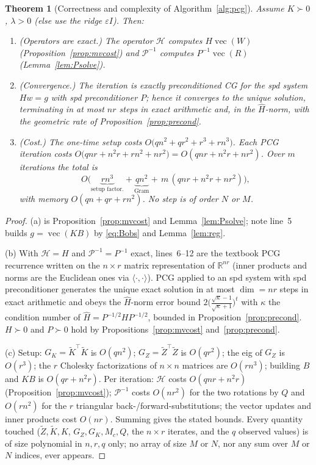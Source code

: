 \documentclass[12pt]{article}
\DeclareMathOperator{\vecop}{vec}
\newcommand{\bR}{\mathbb{R}}
\newcommand{\tZ}{\tilde Z}
\newcommand{\tK}{\tilde K}
\newtheorem{theorem}{Theorem}
\theoremstyle{definition}
\begin{document}
\begin{theorem}[Correctness and complexity of Algorithm~\ref{alg:pcg}]\label{thm:pcg}
Assume $K\succ0$, $\lambda>0$ (else use the ridge $\varepsilon I$). Then:
\begin{enumerate}[label=(\alph*)]
\item \emph{(Operators are exact.)} The operator $\mathcal H$ computes $H\vecop(W)$
(Proposition~\ref{prop:mvcost}) and $\mathcal P^{-1}$ computes $P^{-1}\vecop(R)$
(Lemma~\ref{lem:Psolve}).
\item \emph{(Convergence.)} The iteration is exactly preconditioned CG for the spd
system $Hw=g$ with spd preconditioner $P$; hence it converges to the unique
solution, terminating in at most $nr$ steps in exact arithmetic and, in the
$\widehat H$-norm, with the geometric rate of Proposition~\ref{prop:precond}.
\item \emph{(Cost.)} The one-time setup costs $O\!\big(qn^2+qr^2+r^3+rn^3\big)$.
Each PCG iteration costs $O\!\big(qnr+n^2r+rn^2+nr^2\big)=O(qnr+n^2r+nr^2)$. Over
$m$ iterations the total is
\[
O\!\big(\underbrace{rn^3}_{\text{setup factor.}}+\underbrace{qn^2}_{\text{Gram}}
+\,m\,(qnr+n^2r+nr^2)\big),
\]
with memory $O(qn+qr+rn^2)$. No step is of order $N$ or $M$.
\end{enumerate}
\end{theorem}

\begin{proof}
(a) is Proposition~\ref{prop:mvcost} and Lemma~\ref{lem:Psolve}; note line~5 builds
$g=\vecop(KB)$ by \eqref{eq:Bobs} and Lemma~\ref{lem:reg}.

(b) With $\mathcal H=H$ and $\mathcal P^{-1}=P^{-1}$ exact, lines~6--12 are the
textbook PCG recurrence written on the $n\times r$ matrix representation of
$\bR^{nr}$ (inner products and norms are the Euclidean ones via $\langle\cdot,\cdot\rangle$).
PCG applied to an spd system with spd preconditioner generates the unique exact
solution in at most $\dim=nr$ steps in exact arithmetic and obeys the
$\widehat H$-norm error bound $2\big(\frac{\sqrt\kappa-1}{\sqrt\kappa+1}\big)^t$ with
$\kappa$ the condition number of $\widehat H=P^{-1/2}HP^{-1/2}$, bounded in
Proposition~\ref{prop:precond}. $H\succ0$ and $P\succ0$ hold by
Propositions~\ref{prop:mvcost} and~\ref{prop:precond}.

(c) Setup: $G_K=\tK^\top\tK$ is $O(qn^2)$; $G_Z=\tZ^\top\tZ$ is $O(qr^2)$;
the eig of $G_Z$ is $O(r^3)$; the $r$ Cholesky factorizations of $n\times n$
matrices are $O(rn^3)$; building $B$ and $KB$ is $O(qr+n^2r)$. Per iteration:
$\mathcal H$ costs $O(qnr+n^2r)$ (Proposition~\ref{prop:mvcost});
$\mathcal P^{-1}$ costs $O(nr^2)$ for the two rotations by $Q$ and $O(rn^2)$ for the
$r$ triangular back-/forward-substitutions; the vector updates and inner products
cost $O(nr)$. Summing gives the stated bounds. Every quantity touched ($\tZ,\tK,K$,
$G_Z,G_K,M_c,Q$, the $n\times r$ iterates, and the $q$ observed values) is of size
polynomial in $n,r,q$ only; no array of size $M$ or $N$, nor any sum over $M$ or
$N$ indices, ever appears.
\end{proof}
\end{document}
